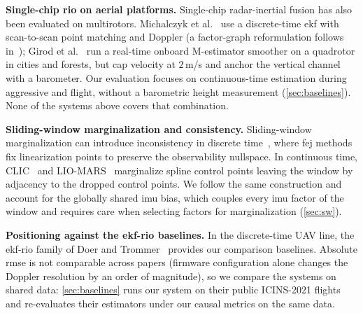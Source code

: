 \textbf{Single-chip \ac{rio} on aerial platforms.}
Single-chip radar-inertial fusion has also been evaluated on multirotors.
Michalczyk et al.~\cite{michalczyk2022ekf} use a
discrete-time \ac{ekf} with scan-to-scan point matching and Doppler (a
factor-graph reformulation follows in~\cite{michalczyk2024fg}); Girod et
al.~\cite{girod2024brio} run a real-time onboard M-estimator smoother on a
quadrotor in cities and forests, but cap velocity at
$2$\,m/s and anchor the vertical channel with a
barometer.  Our evaluation focuses on continuous-time estimation during
aggressive and  flight, without a barometric height
measurement (\autoref{sec:baselines}).  None of the systems above
covers that combination.

\textbf{Sliding-window marginalization and consistency.}
Sliding-window marginalization can introduce inconsistency
in discrete time~\cite{dongsi2012consistency}, where \ac{fej}
methods fix linearization points to preserve the observability nullspace.
In continuous time, CLIC~\cite{lv2023clic} and
LIO-MARS~\cite{quenzel2025liomars} marginalize spline control points leaving the
window by adjacency to the dropped control points.  We follow the same
construction and account for the globally shared
\ac{imu} bias, which couples every \ac{imu} factor of the window and
requires care when selecting factors for marginalization
(\autoref{sec:sw}).

\textbf{Positioning against the \ac{ekf}-\ac{rio} baselines.}
In the discrete-time UAV line, the \ac{ekf}-\ac{rio} family of Doer and
Trommer~\cite{doer2020ekf} provides our comparison baselines.  Absolute
\ac{rmse} is not comparable across papers (firmware configuration alone
changes the Doppler resolution by an order of magnitude), so we
compare the systems on shared data:
\autoref{sec:baselines} runs our system on their public ICINS-2021
flights~\cite{doer2021yrio} and re-evaluates their estimators under
our causal metrics on the same data.
